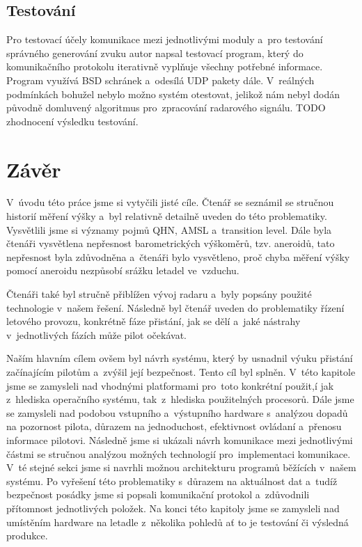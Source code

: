	\section{Testování}
	Pro testovací účely komunikace mezi jednotlivými moduly a~pro testování správného generování zvuku autor napsal testovací program, který do komunikačního protokolu iterativně vyplňuje všechny potřebné informace. Program využívá BSD schránek a~odesílá UDP pakety dále.
	V~reálných podmínkách bohužel nebylo možno systém otestovat, jelikož nám nebyl dodán původně domluvený algoritmus pro~zpracování radarového signálu. TODO zhodnocení výsledku testování.
	
\chapter{Závěr}
	V~úvodu této práce jsme si vytyčili jisté cíle. Čtenář se seznámil se stručnou historií měření výšky a~byl relativně detailně uveden do této problematiky. Vysvětlili jsme si významy pojmů QHN, AMSL a~transition level. Dále byla čtenáři vysvětlena nepřesnost barometrických výškoměrů, tzv. aneroidů, tato nepřesnost byla zdůvodněna a~čtenáři bylo vysvětleno, proč chyba měření výšky pomocí aneroidu nezpůsobí srážku letadel ve~vzduchu.\par
	Čtenáři také byl stručně přiblížen vývoj radaru a~byly popsány použité technologie v~našem řešení. Následně byl čtenář uveden do problematiky řízení letového provozu, konkrétně fáze přistání, jak se dělí a~jaké nástrahy v~jednotlivých fázích může pilot očekávat.\par
	Naším hlavním cílem ovšem byl návrh systému, který by usnadnil výuku přistání začínajícím pilotům a~zvýšil její bezpečnost. Tento cíl byl splněn. V~této kapitole jsme se zamysleli nad vhodnými platformami pro~toto konkrétní použit,í jak z~hlediska operačního systému, tak~z~hlediska použitelných procesorů. Dále jsme se zamysleli nad podobou vstupního a~výstupního hardware s~analýzou dopadů na pozornost pilota, důrazem na jednoduchost, efektivnost ovládaní a~přenosu informace pilotovi. Následně jsme si ukázali návrh komunikace mezi jednotlivými částmi se stručnou analýzou možných technologií pro~implementaci komunikace. V~té stejné sekci jsme si navrhli možnou architekturu programů běžících v~našem systému. Po vyřešení této problematiky s~důrazem na aktuálnost dat a~tudíž bezpečnost posádky jsme si popsali komunikační protokol a~zdůvodnili přítomnost jednotlivých položek. Na konci této kapitoly jsme se zamysleli nad umístěním hardware na letadle z~několika pohledů ať to je testování či výsledná produkce.\par
